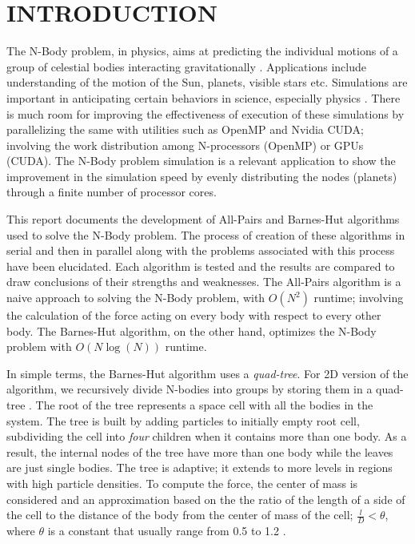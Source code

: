 \section{INTRODUCTION}

The N-Body problem, in physics, aims at predicting the individual motions of a group of celestial bodies interacting gravitationally \cite{c1}.  Applications include understanding of the motion of the Sun, planets, visible stars etc. Simulations are important in anticipating certain behaviors in science, especially physics \cite{c2}. There is much room for improving the effectiveness of execution of these simulations by parallelizing the same with utilities such as OpenMP and Nvidia CUDA; involving the work distribution among N-processors (OpenMP) or GPUs (CUDA). The N-Body problem simulation is a relevant application to show the improvement in the simulation speed by evenly distributing the nodes (planets) through a finite number of processor cores.\par

This report documents the development of All-Pairs and Barnes-Hut algorithms used to solve the N-Body problem. The process of creation of these algorithms in serial and then in parallel along with the problems associated with this process have been elucidated. Each algorithm is tested and the results are compared to draw conclusions of their strengths and weaknesses. The All-Pairs algorithm is a naive approach to solving the N-Body problem, with \(O(N^2)\) runtime; involving the calculation of the force acting on every body with respect to every other body. The Barnes-Hut algorithm, on the other hand, optimizes the N-Body problem with \(O(N\log(N))\) runtime.\par

In simple terms, the Barnes-Hut algorithm uses a \textit{quad-tree}. For 2D version of the algorithm, we recursively divide N-bodies into groups by storing them in a quad-tree \cite{c3}. The root of the tree represents a space cell with all the bodies in the system. The tree is built by adding particles to initially empty root cell, subdividing the cell into \textit{four} children when it contains more than one body. As a result, the internal nodes of the tree have more than one body while the leaves are just single bodies. The tree is adaptive; it extends to more levels in regions with high particle densities. To compute the force, the center of mass is considered and an approximation based on the the ratio of the length of a side of the cell to the distance of the body from the center of mass of the cell; \(\frac{l}{D} < \theta\), where \(\theta\) is a constant that usually range from 0.5 to 1.2 \cite{c3}.\par


